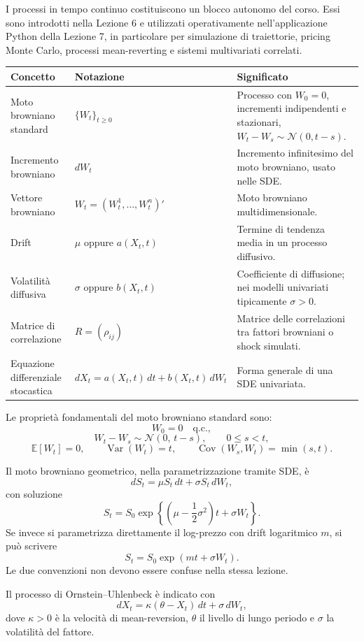 \documentclass[12pt,a4paper]{article}
\newcommand{\E}{\mathbb{E}}
\newcommand{\1}{\mathbf{1}}
\newcommand{\Var}{\operatorname{Var}}
\newcommand{\Cov}{\operatorname{Cov}}
\begin{document}
I processi in tempo continuo costituiscono un blocco autonomo del corso. Essi
sono introdotti nella Lezione 6 e utilizzati operativamente nell'applicazione
Python della Lezione 7, in particolare per simulazione di traiettorie, pricing
Monte Carlo, processi mean-reverting e sistemi multivariati correlati.

\begin{longtable}{>{\raggedright}p{3.4cm}>{\raggedright}p{4.4cm}>{\raggedright\arraybackslash}p{6.6cm}}
\hline
\textbf{Concetto} & \textbf{Notazione} & \textbf{Significato}\\
\hline
Moto browniano standard & $\{W_t\}_{t\geq 0}$ & Processo con $W_0=0$, incrementi indipendenti e stazionari, $W_t-W_s\sim\mathcal{N}(0,t-s)$.\\
Incremento browniano & $dW_t$ & Incremento infinitesimo del moto browniano, usato nelle SDE.\\
Vettore browniano & $W_t=(W_t^1,\ldots,W_t^n)'$ & Moto browniano multidimensionale.\\
Drift & $\mu$ oppure $a(X_t,t)$ & Termine di tendenza media in un processo diffusivo.\\
Volatilit\`a diffusiva & $\sigma$ oppure $b(X_t,t)$ & Coefficiente di diffusione; nei modelli univariati tipicamente $\sigma>0$.\\
Matrice di correlazione & $R=(\rho_{ij})$ & Matrice delle correlazioni tra fattori browniani o shock simulati.\\
Equazione differenziale stocastica & $dX_t=a(X_t,t)\,dt+b(X_t,t)\,dW_t$ & Forma generale di una SDE univariata.\\
\hline
\end{longtable}

Le propriet\`a fondamentali del moto browniano standard sono:
\[
W_0=0 \quad \text{q.c.},
\]
\[
W_t-W_s\sim\mathcal{N}(0,\,t-s), \qquad 0\leq s<t,
\]
\[
\E[W_t]=0, \qquad \Var(W_t)=t, \qquad
\Cov(W_s,W_t)=\min(s,t).
\]

Il moto browniano geometrico, nella parametrizzazione tramite SDE, \`e
\[
 dS_t=\mu S_t\,dt+\sigma S_t\,dW_t,
\]
con soluzione
\[
 S_t=S_0\exp\left\{\left(\mu-\frac{1}{2}\sigma^2\right)t+\sigma W_t\right\}.
\]
Se invece si parametrizza direttamente il log-prezzo con drift logaritmico
$m$, si pu\`o scrivere
\[
 S_t=S_0\exp\left(m t+\sigma W_t\right).
\]
Le due convenzioni non devono essere confuse nella stessa lezione.

Il processo di Ornstein--Uhlenbeck \`e indicato con
\[
 dX_t=\kappa(\theta-X_t)\,dt+\sigma\,dW_t,
\]
dove $\kappa>0$ \`e la velocit\`a di mean-reversion, $\theta$ il livello di
lungo periodo e $\sigma$ la volatilit\`a del fattore.
\end{document}
